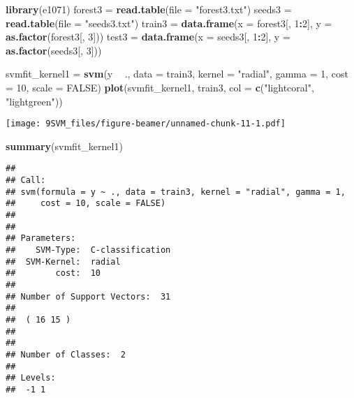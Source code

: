 \documentclass[10pt,ignorenonframetext,]{beamer}
\newenvironment{Shaded}{\begin{snugshade}}{\end{snugshade}}
\newcommand{\KeywordTok}[1]{\textcolor[rgb]{0.13,0.29,0.53}{\textbf{#1}}}
\newcommand{\DataTypeTok}[1]{\textcolor[rgb]{0.13,0.29,0.53}{#1}}
\newcommand{\DecValTok}[1]{\textcolor[rgb]{0.00,0.00,0.81}{#1}}
\newcommand{\StringTok}[1]{\textcolor[rgb]{0.31,0.60,0.02}{#1}}
\newcommand{\OtherTok}[1]{\textcolor[rgb]{0.56,0.35,0.01}{#1}}
\newcommand{\OperatorTok}[1]{\textcolor[rgb]{0.81,0.36,0.00}{\textbf{#1}}}
\newcommand{\NormalTok}[1]{#1}
\begin{document}
\begin{frame}[fragile]

\footnotesize

\begin{Shaded}
\begin{Highlighting}[]
\KeywordTok{library}\NormalTok{(e1071)}
\NormalTok{forest3 =}\StringTok{ }\KeywordTok{read.table}\NormalTok{(}\DataTypeTok{file =} \StringTok{"forest3.txt"}\NormalTok{)}
\NormalTok{seeds3 =}\StringTok{ }\KeywordTok{read.table}\NormalTok{(}\DataTypeTok{file =} \StringTok{"seeds3.txt"}\NormalTok{)}
\NormalTok{train3 =}\StringTok{ }\KeywordTok{data.frame}\NormalTok{(}\DataTypeTok{x =}\NormalTok{ forest3[, }\DecValTok{1}\OperatorTok{:}\DecValTok{2}\NormalTok{], }\DataTypeTok{y =} \KeywordTok{as.factor}\NormalTok{(forest3[, }\DecValTok{3}\NormalTok{]))}
\NormalTok{test3 =}\StringTok{ }\KeywordTok{data.frame}\NormalTok{(}\DataTypeTok{x =}\NormalTok{ seeds3[, }\DecValTok{1}\OperatorTok{:}\DecValTok{2}\NormalTok{], }\DataTypeTok{y =} \KeywordTok{as.factor}\NormalTok{(seeds3[, }\DecValTok{3}\NormalTok{]))}
\end{Highlighting}
\end{Shaded}

\end{frame}

\begin{frame}[fragile]

\begin{Shaded}
\begin{Highlighting}[]
\NormalTok{svmfit_kernel1 =}\StringTok{ }\KeywordTok{svm}\NormalTok{(y }\OperatorTok{~}\StringTok{ }\NormalTok{., }\DataTypeTok{data =}\NormalTok{ train3, }\DataTypeTok{kernel =} \StringTok{"radial"}\NormalTok{, }\DataTypeTok{gamma =} \DecValTok{1}\NormalTok{, }
    \DataTypeTok{cost =} \DecValTok{10}\NormalTok{, }\DataTypeTok{scale =} \OtherTok{FALSE}\NormalTok{)}
\KeywordTok{plot}\NormalTok{(svmfit_kernel1, train3, }\DataTypeTok{col =} \KeywordTok{c}\NormalTok{(}\StringTok{"lightcoral"}\NormalTok{, }\StringTok{"lightgreen"}\NormalTok{))}
\end{Highlighting}
\end{Shaded}

\texttt{[image: 9SVM\_files/figure-beamer/unnamed-chunk-11-1.pdf]}

\begin{Shaded}
\begin{Highlighting}[]
\KeywordTok{summary}\NormalTok{(svmfit_kernel1)}
\end{Highlighting}
\end{Shaded}

\begin{verbatim}
## 
## Call:
## svm(formula = y ~ ., data = train3, kernel = "radial", gamma = 1, 
##     cost = 10, scale = FALSE)
## 
## 
## Parameters:
##    SVM-Type:  C-classification 
##  SVM-Kernel:  radial 
##        cost:  10 
## 
## Number of Support Vectors:  31
## 
##  ( 16 15 )
## 
## 
## Number of Classes:  2 
## 
## Levels: 
##  -1 1
\end{verbatim}

\normalsize

\end{frame}
\end{document}

